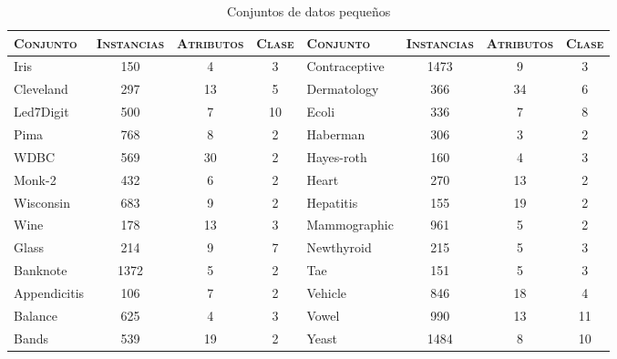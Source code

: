 \begin{table}[h!]
\centering
\begin{adjustbox}{max width =\textwidth}
\begin{tabular}{l c c c|l c c c}
\hline
\textsc{Conjunto} & \textsc{Instancias} & \textsc{Atributos} & \textsc{Clase} & \textsc{Conjunto} & \textsc{Instancias} & \textsc{Atributos} & \textsc{Clase} \\
\hline
\hline

Iris          & 150  &  4 &  3 & Contraceptive & 1473 & 9  &  3 \\
Cleveland     & 297  & 13 &  5 & Dermatology   &  366 & 34 &  6 \\
Led7Digit     & 500  &  7 & 10 & Ecoli         &  336 &  7 &  8 \\
Pima          & 768  &  8 &  2 & Haberman      &  306 & 3  &  2 \\
WDBC          & 569  & 30 &  2 & Hayes-roth    &  160 & 4  &  3 \\
Monk-2        & 432  &  6 &  2 & Heart         &  270 & 13 &  2 \\
Wisconsin     & 683  &  9 &  2 & Hepatitis     &  155 & 19 &  2 \\
Wine          & 178  & 13 &  3 & Mammographic  &  961 & 5  &  2 \\
Glass         & 214  &  9 &  7 & Newthyroid    &  215 & 5  &  3 \\
Banknote      & 1372 &  5 &  2 & Tae           &  151 & 5  &  3 \\
Appendicitis  & 106  &  7 &  2 & Vehicle       &  846 & 18 &  4 \\
Balance       & 625  &  4 &  3 & Vowel         &  990 & 13 & 11 \\
Bands         & 539  & 19 &  2 & Yeast         & 1484 & 8  & 10 \\


 
\hline
\end{tabular}
\end{adjustbox}
\caption{Conjuntos de datos pequeños}
\label{pequenios}
\end{table}


